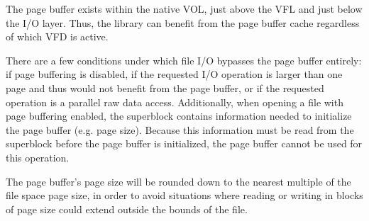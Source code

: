 
The page buffer exists within the native VOL, just above the VFL and just below the I/O layer. Thus, the library can benefit from the page buffer cache regardless of which VFD is active. 

There are a few conditions under which file I/O bypasses the page buffer entirely: if page buffering is disabled, if the requested I/O operation is larger than one page and thus would not benefit from the page buffer, or if the requested operation is a parallel raw data access. Additionally, when opening a file with page buffering enabled, the superblock contains information needed to initialize the page buffer (e.g. page size). Because this information must be read from the superblock before the page buffer is initialized, the page buffer cannot be used for this operation.

The page buffer's page size will be rounded down to the nearest multiple of the file space page size, in order to avoid situations where reading or writing in blocks of page size could extend outside the bounds of the file.

